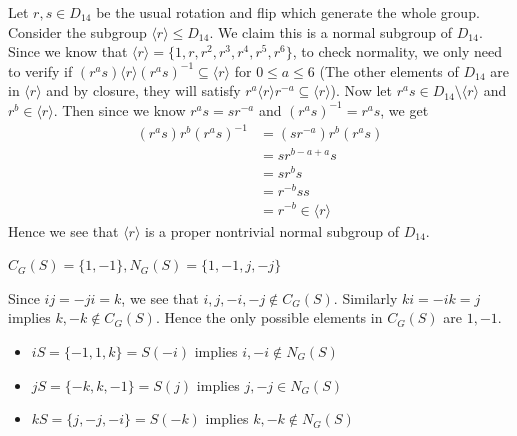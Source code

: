 \documentclass[12pt]{exam}
\theoremstyle{plain} %
\theoremstyle{definition} %
\theoremstyle{remark} %
\begin{document}
\begin{questions}
  \question
  \begin{solution}
    Let $r, s \in D_{14}$ be the usual rotation and flip which generate the whole group. Consider the subgroup $\langle r \rangle \leqslant D_{14}$. We claim this is a normal subgroup of $D_{14}$. Since we know that $\langle r  \rangle = \{ 1, r, r^2, r^3, r^4, r^5, r^6 \}$, to check normality, we only need to verify if $(r^as) \langle r \rangle (r^as)^{-1} \subseteq \langle r \rangle$ for $0 \le a \le 6$ (The other elements of $D_{14}$ are in $\langle  r  \rangle$ and by closure, they will satisfy $r^a \langle r  \rangle r^{-a} \subseteq \langle r  \rangle $). Now let $r^as \in D_{14}\setminus \langle r \rangle$ and $r^{b} \in \langle r \rangle $. Then since we know $r^as = sr^{-a}$ and $(r^{a}s)^{-1} = r^{a}s$, we get \begin{align*}
      (r^as) r^b (r^{ a}s)^{-1} &= (sr^{-a})r^b(r^a s) \\ 
      & = sr^{b-a+a}s \\ 
      & = sr^{b}s \\ 
      &= r^{-b}ss \\ 
      &= r^{-b} \in \langle r  \rangle 
    \end{align*}
    Hence we see that $\langle r \rangle $ is a proper nontrivial normal subgroup of $D_{14}$. 
  \end{solution}

  \question
  \begin{solution}
    $C_G(S) = \{ 1, -1 \}, N_G(S) = \{ 1, -1, j, -j \}$

    Since $ij = -ji = k$, we see that $i, j, -i, -j \notin C_G(S)$. Similarly $ki = -ik = j$ implies $ k , -k \notin C_G(S)$. Hence the only possible elements in $C_G(S)$ are $1, -1$.

    \begin{itemize}
      \item $iS = \{ -1, 1, k\} = S(-i)$ implies $i, -i \notin N_G(S)$
      \item $jS = \{ -k, k, -1 \} = S(j)$ implies $j, -j \in N_G(S)$
      \item $kS = \{ j , -j, -i \} = S(-k)$ implies $k, -k \notin N_G(S)$
    \end{itemize}
  \end{solution}


\end{questions}
\end{document}
